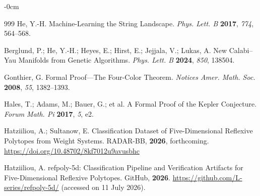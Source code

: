 \documentclass[appliedmath,article,submit,moreauthors]{Definitions/mdpi}
\begin{document}
\begin{adjustwidth}{-\extralength}{0cm}
\begin{thebibliography}{999}
He, Y.-H.
Machine-Learning the String Landscape.
\textit{Phys. Lett. B} \textbf{2017}, \textit{774}, 564--568.

Berglund, P.; He, Y.-H.; Heyes, E.; Hirst, E.; Jejjala, V.; Lukas, A.
New Calabi--Yau Manifolds from Genetic Algorithms.
\textit{Phys. Lett. B} \textbf{2024}, \textit{850}, 138504.

Gonthier, G.
Formal Proof---The Four-Color Theorem.
\textit{Notices Amer. Math. Soc.} \textbf{2008}, \textit{55}, 1382--1393.

Hales, T.; Adams, M.; Bauer, G.; et al.
A Formal Proof of the Kepler Conjecture.
\textit{Forum Math. Pi} \textbf{2017}, \textit{5}, e2.

Hatziiliou, A.; Sultanow, E.
Classification Dataset of Five-Dimensional Reflexive Polytopes from Weight Systems.
RADAR-BB, \textbf{2026}, forthcoming.
\url{https://doi.org/10.48702/8kf7012u9avusbhc}

Hatziiliou, A.
refpoly-5d: Classification Pipeline and Verification Artifacts for
Five-Dimensional Reflexive Polytopes.
GitHub, \textbf{2026}.
\url{https://github.com/L-series/refpoly-5d/}
(accessed on 11 July 2026).

\end{thebibliography}

\PublishersNote{}
\end{adjustwidth}
\end{document}
